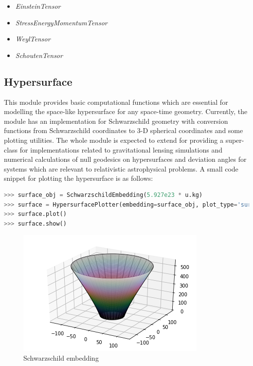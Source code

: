 \documentclass[onecolumn]{aa}
\begin{document}
\begin{itemize}
\item \textit{EinsteinTensor}
\item \textit{StressEnergyMomentumTensor}
\item \textit{WeylTensor}
\item \textit{SchoutenTensor}
\end{itemize}






\subsection{Hypersurface}
This module provides basic computational functions which are essential for modelling the space-like hypersurface for any space-time geometry. Currently, the module has an implementation for Schwarzschild geometry with conversion functions from Schwarzschild coordinates to 3-D spherical coordinates and some plotting utilities. The whole module is expected to extend for providing a super-class for implementations related to gravitational lensing simulations and numerical calculations of null geodesics on hypersurfaces and deviation angles for systems which are relevant to relativistic astrophysical problems. A small code snippet for plotting the hypersurface is as follows:
\begin{lstlisting}[language=Python, caption=Schwarzschild Embedding]
>>> surface_obj = SchwarzschildEmbedding(5.927e23 * u.kg)
>>> surface = HypersurfacePlotter(embedding=surface_obj, plot_type='surface')
>>> surface.plot()
>>> surface.show()
\end{lstlisting}
\begin{figure}[ht]
	\centering
	\includegraphics[scale=0.5]{figures/hypersurface_surface.png} %
	\caption{Schwarzschild embedding}
	\label{fig:hypersurface}
\end{figure}
\end{document}
